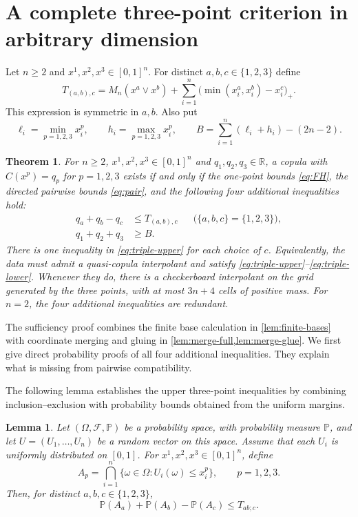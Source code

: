 \documentclass[a4paper,11pt]{amsart}
\numberwithin{equation}{section}
\newtheorem{theorem}{Theorem}[section]
\newtheorem{lemma}[lemma]{Lemma}
\theoremstyle{definition}
\theoremstyle{remark}
\newcommand{\R}{\mathbb R}
\newcommand{\Prob}{\mathbb P}
\begin{document}
\section{A complete three-point criterion in arbitrary dimension}\label{sec:three}
Let $n\geq2$ and $x^1,x^2,x^3\in[0,1]^n$. For distinct $a,b,c\in\{1,2,3\}$ define
\begin{equation}
 T_{(a,b),c}=M_n(x^a\vee x^b)
       +\sum_{i=1}^n\bigl(\min(x_i^a,x_i^b)-x_i^c\bigr)_+.
 \label{eq:T}
\end{equation}
This expression is symmetric in $a,b$. Also put
\begin{equation}
 \ell_i=\min_{p=1,2,3}x_i^p,\qquad
 h_i=\max_{p=1,2,3}x_i^p,\qquad
 B=\sum_{i=1}^n(\ell_i+h_i)-(2n-2).\label{eq:B}
\end{equation}

\begin{theorem}\label{thm:three}
For $n\geq2$, $x^1,x^2,x^3\in[0,1]^n$ and $q_1,q_2,q_3\in\R$, a copula with
$C(x^p)=q_p$ for $p=1,2,3$ exists if and only if the one-point bounds
\eqref{eq:FH}, the directed pairwise bounds \eqref{eq:pair}, and the following
four additional inequalities hold:
\begin{align}
 q_a+q_b-q_c&\leq T_{(a,b), c}
 &&\bigl(\{a,b,c\}=\{1,2,3\}\bigr),\label{eq:triple-upper}\\
 q_1+q_2+q_3&\geq B.\label{eq:triple-lower}
\end{align}
There is one inequality in \eqref{eq:triple-upper} for each choice of $c$.
Equivalently, the data must admit a quasi-copula interpolant and satisfy
\eqref{eq:triple-upper}--\eqref{eq:triple-lower}.
Whenever they do, there is a checkerboard interpolant on the grid generated
by the three points, with at most $3n+4$ cells of positive mass.
For $n=2$, the four additional inequalities are redundant. 
\end{theorem}

The sufficiency proof combines the finite base calculation in
\cref{lem:finite-bases} with coordinate merging and gluing in
\cref{lem:merge-full,lem:merge-glue}. We first give direct probability proofs of all four
additional inequalities. They explain what is missing from pairwise
compatibility.


The following lemma establishes the upper three-point inequalities by
combining inclusion--exclusion with probability bounds obtained from
the uniform margins.

\begin{lemma}\label{lem:upper}
Let $(\Omega,\mathcal F,\Prob)$ be a probability space, with probability
measure $\Prob$, and let $U=(U_1,\ldots,U_n)$ be a random vector on this
space. Assume that each $U_i$ is uniformly distributed on $[0,1]$.
For $x^1,x^2,x^3\in[0,1]^n$, define
\[
 A_p=\bigcap_{i=1}^n
       \{\omega\in\Omega:U_i(\omega)\leq x_i^p\},
 \qquad p=1,2,3.
\]
Then, for distinct $a,b,c\in\{1,2,3\}$,
\[
 \Prob(A_a)+\Prob(A_b)-\Prob(A_c)\leq T_{ab;c}.
\]
\end{lemma}
\end{document}
